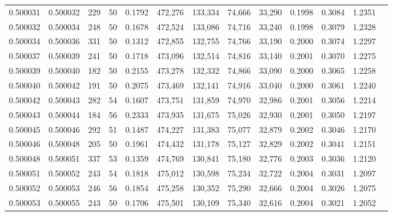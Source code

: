 \begin{tabular}{rrrrrrrrrrrrr}
0.500031 & 0.500032 & 229 &  50 &                                     0.1792 & 472,276 & 133,334 &  74,666 &  33,290 & 0.1998 & 0.3084 & 1.2351 \\
0.500032 & 0.500034 & 248 &  50 &                                     0.1678 & 472,524 & 133,086 &  74,716 &  33,240 & 0.1998 & 0.3079 & 1.2328 \\
0.500034 & 0.500036 & 331 &  50 &                                     0.1312 & 472,855 & 132,755 &  74,766 &  33,190 & 0.2000 & 0.3074 & 1.2297 \\
0.500037 & 0.500039 & 241 &  50 &                                     0.1718 & 473,096 & 132,514 &  74,816 &  33,140 & 0.2001 & 0.3070 & 1.2275 \\
0.500039 & 0.500040 & 182 &  50 &                                     0.2155 & 473,278 & 132,332 &  74,866 &  33,090 & 0.2000 & 0.3065 & 1.2258 \\
0.500040 & 0.500042 & 191 &  50 &                                     0.2075 & 473,469 & 132,141 &  74,916 &  33,040 & 0.2000 & 0.3061 & 1.2240 \\
0.500042 & 0.500043 & 282 &  54 &                                     0.1607 & 473,751 & 131,859 &  74,970 &  32,986 & 0.2001 & 0.3056 & 1.2214 \\
0.500043 & 0.500044 & 184 &  56 &                                     0.2333 & 473,935 & 131,675 &  75,026 &  32,930 & 0.2001 & 0.3050 & 1.2197 \\
0.500045 & 0.500046 & 292 &  51 &                                     0.1487 & 474,227 & 131,383 &  75,077 &  32,879 & 0.2002 & 0.3046 & 1.2170 \\
0.500046 & 0.500048 & 205 &  50 &                                     0.1961 & 474,432 & 131,178 &  75,127 &  32,829 & 0.2002 & 0.3041 & 1.2151 \\
0.500048 & 0.500051 & 337 &  53 &                                     0.1359 & 474,769 & 130,841 &  75,180 &  32,776 & 0.2003 & 0.3036 & 1.2120 \\
0.500051 & 0.500052 & 243 &  54 &                                     0.1818 & 475,012 & 130,598 &  75,234 &  32,722 & 0.2004 & 0.3031 & 1.2097 \\
0.500052 & 0.500053 & 246 &  56 &                                     0.1854 & 475,258 & 130,352 &  75,290 &  32,666 & 0.2004 & 0.3026 & 1.2075 \\
0.500053 & 0.500055 & 243 &  50 &                                     0.1706 & 475,501 & 130,109 &  75,340 &  32,616 & 0.2004 & 0.3021 & 1.2052 \\

\end{tabular}
